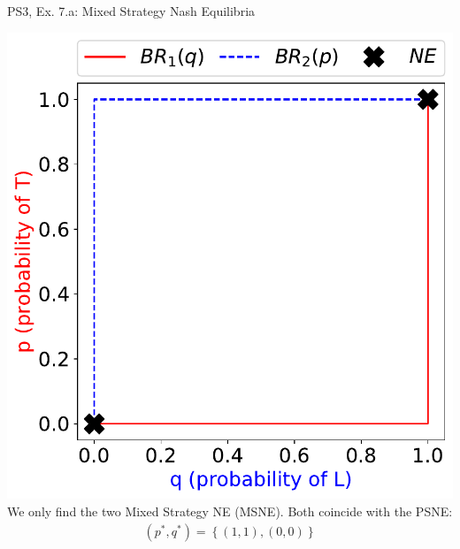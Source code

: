 \begin{frame}{PS3, Ex. 7.a: Mixed Strategy Nash Equilibria}
\begin{multicols}{2}
    \includegraphics[width=\columnwidth]{figures/5a2}
    We only find the two Mixed Strategy NE (MSNE). Both coincide with the PSNE:
    \begin{align*}
      (p^{*},q^{*})=\left\{(1,1),(0,0)\right\}
    \end{align*}
  \vfill\null
  \end{multicols}
\end{frame}
